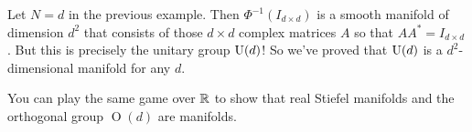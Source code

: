 	\begin{example}\label{ex:U(d) manifold}
		Let $N=d$ in the previous example. Then $\Phi^{-1}(I_{d \times d})$ is a smooth manifold of dimension $d^2$ that consists of those $d \times d$ complex matrices $A$ so that $AA^\ast = I_{d \times d}$. But this is precisely the unitary group $\operatorname{U}(d)$! So we've proved that $\operatorname{U}(d)$ is a $d^2$-dimensional manifold for any $d$.
	\end{example}
	
	\begin{remark}
		You can play the same game over $\mathbb{R}$ to show that real Stiefel manifolds and the orthogonal group $\operatorname{O}(d)$ are manifolds.
	\end{remark}
